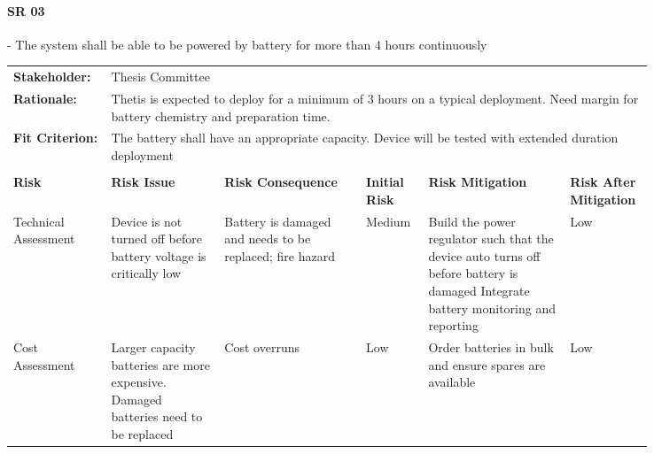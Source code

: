 \begin{landscape}


\paragraph*{SR 03} - The system shall be able to be powered by battery for more than 4 hours continuously

{\fontsize{8pt}{8pt}\selectfont
\begin{longtable}{| p{0.12\linewidth} | p{0.16\linewidth} |  p{0.20\linewidth} | p{0.08\linewidth} | p{0.20\linewidth} | p{0.08\linewidth} |}
	\hline \endlastfoot
	
	\hline
	\rowcolor[gray]{0.8}
	\multicolumn{6}{|c|}{ } \\
	\hline
	\textbf{Stakeholder:} & \multicolumn{5}{|l|}{Thesis Committee} \\
	\hline
	\textbf{Rationale:} & \multicolumn{5}{|p{0.8\linewidth}|}{Thetis is expected to deploy for a minimum of 3 hours on a typical deployment. Need margin for battery chemistry and preparation time.} \\
	\hline
	\textbf{Fit Criterion:} & \multicolumn{5}{|p{0.8\linewidth}|}{The battery shall have an appropriate capacity. Device will be tested with extended duration deployment} \\
	\hline
	\rowcolor[gray]{0.8}
	\multicolumn{6}{|c|}{ } \\
	\hline
	\textbf{Risk} & \textbf{Risk Issue} & \textbf{Risk Consequence} & \textbf{Initial Risk} & \textbf{Risk Mitigation} & \textbf{Risk \newline After \newline Mitigation} \\
	\hline
	Technical \newline Assessment & Device is not turned off before battery voltage is critically low & Battery is damaged and needs to be replaced; fire hazard & \cellcolor{yellow} Medium & Build the power regulator such that the device auto turns off before battery is damaged \newline Integrate battery monitoring and reporting & \cellcolor{green} Low \\
	\hline
	Cost \newline Assessment & Larger capacity batteries are more expensive. \newline Damaged batteries need to be replaced & Cost overruns & \cellcolor{green} Low & Order batteries in bulk and ensure spares are available & \cellcolor{green} Low \\

\end{longtable}}
\end{landscape}
